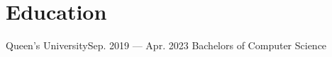 \section{Education}
    \resumeSubHeadingListStart
    
    \resumeSubheading
    {Queen's University}{Sep. 2019 --- Apr. 2023}
    {Bachelors of Computer Science}{}
    
    \resumeSubHeadingListEnd